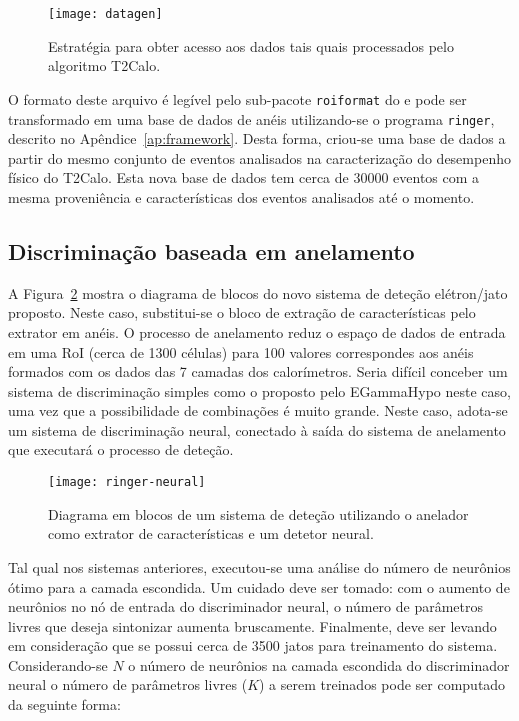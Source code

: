 \begin{figure}
\begin{center}
\texttt{[image: datagen]}
\end{center}
\caption{Estratégia para obter acesso aos dados tais quais processados pelo
algoritmo T2Calo.}
\label{fig:datagen}
\end{figure}

O formato deste arquivo é legível pelo sub-pacote \texttt{roiformat} do
 e pode ser transformado em uma base de dados de anéis
utilizando-se o programa \texttt{ringer}, descrito no
Apêndice~\ref{ap:framework}. Desta forma, criou-se uma base de dados a partir
do mesmo conjunto de eventos analisados na caracterização do desempenho físico
do T2Calo. Esta nova base de dados tem cerca de $30000$ eventos com a mesma
proveniência e características dos eventos analisados até o momento.

\subsection{Discriminação baseada em anelamento}

A Figura~\ref{fig:ringer-neural} mostra o diagrama de blocos do novo sistema
de deteção elétron/jato proposto. Neste caso, substitui-se o bloco de extração
de características pelo extrator em anéis. O processo de anelamento reduz o
espaço de dados de entrada em uma RoI (cerca de 1300 células) para 100 valores
correspondes aos anéis formados com os dados das 7 camadas dos
calorímetros. Seria difícil conceber um sistema de discriminação simples como
o proposto pelo EGammaHypo neste caso, uma vez que a possibilidade de
combinações é muito grande. Neste caso, adota-se um sistema de discriminação
neural, conectado à saída do sistema de anelamento que executará o processo de
deteção.

\begin{figure}
\begin{center}
\texttt{[image: ringer-neural]}
\end{center}
\caption{Diagrama em blocos de um sistema de deteção utilizando o anelador
como extrator de características e um detetor neural.}
\label{fig:ringer-neural}
\end{figure}

Tal qual nos sistemas anteriores, executou-se uma análise do número de
neurônios ótimo para a camada escondida. Um cuidado deve ser tomado: com o
aumento de neurônios no nó de entrada do discriminador neural, o número de
parâmetros livres que deseja sintonizar aumenta bruscamente. Finalmente, deve
ser levando em consideração que se possui cerca de 3500 jatos para treinamento
do sistema. Considerando-se $N$ o número de neurônios na camada escondida do
discriminador neural o número de parâmetros livres ($K$) a serem treinados
pode ser computado da seguinte forma:

